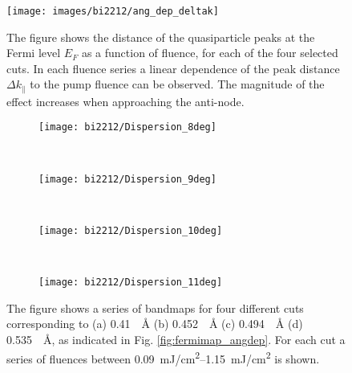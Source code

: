 \begin{figure}[b!]
	\centering
	\texttt{[image: images/bi2212/ang\_dep\_deltak]}
	\caption{The figure shows the distance of the quasiparticle peaks at the Fermi level $E_F$ as a function of fluence, for each of the four selected cuts. In each fluence series a linear dependence of the peak distance $\Delta k_\parallel$ to the pump fluence can be observed. The magnitude of the effect increases when approaching the anti-node.}
	\label{fig:angdep_deltak}
\end{figure}

\begin{figure}[t!]
	\centering
	\begin{subfigure}[b]{0.95\textwidth}
		\texttt{[image: bi2212/Dispersion\_8deg]}
		\caption{}
	\end{subfigure}
	\\
	\begin{subfigure}[b]{0.95\textwidth}
		\texttt{[image: bi2212/Dispersion\_9deg]}
		\caption{}
	\end{subfigure}
	\\
	\begin{subfigure}[b]{0.95\textwidth}
		\texttt{[image: bi2212/Dispersion\_10deg]}
		\caption{}
	\end{subfigure}
	\\
	\begin{subfigure}[b]{0.95\textwidth}
		\texttt{[image: bi2212/Dispersion\_11deg]}
		\caption{}
	\end{subfigure}
	\caption{The figure shows a series of bandmaps for four different cuts corresponding to (a) \qty{0.41}{\per\angstrom} (b) \qty{0.452}{\per\angstrom} (c) \qty{0.494}{\per\angstrom} (d) \qty{0.535}{\per\angstrom}, as indicated in Fig. \ref{fig:fermimap_angdep}. For each cut a series of fluences between \qtyrange{0.09}{1.15}{\milli\joule/\centi\meter\squared} is shown.}
	\label{fig:effect_angle}
\end{figure}

